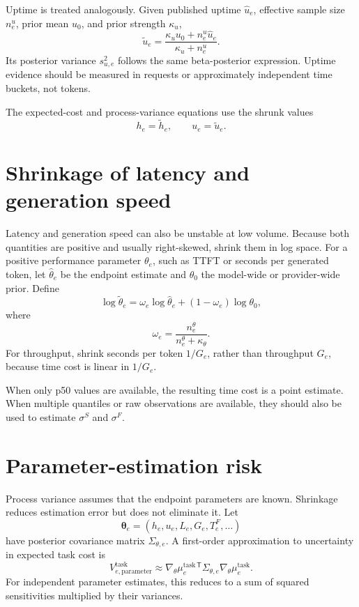\documentclass[11pt]{article}
\begin{document}
Uptime is treated analogously. Given published uptime $\hat u_e$, effective
sample size $n_e^u$, prior mean $u_0$, and prior strength $\kappa_u$,
\begin{equation}
\boxed{
\tilde u_e
=\frac{\kappa_uu_0+n_e^u\hat u_e}{\kappa_u+n_e^u}
}.
\end{equation}
Its posterior variance $s_{u,e}^2$ follows the same beta-posterior expression.
Uptime evidence should be measured in requests or approximately independent time
buckets, not tokens.

The expected-cost and process-variance equations use the shrunk values
\begin{equation}
h_e=\tilde h_e,
\qquad
u_e=\tilde u_e.
\end{equation}

\section{Shrinkage of latency and generation speed}

Latency and generation speed can also be unstable at low volume. Because both
quantities are positive and usually right-skewed, shrink them in log space. For a
positive performance parameter $\theta_e$, such as TTFT or seconds per generated
token, let $\hat\theta_e$ be the endpoint estimate and $\theta_0$ the model-wide
or provider-wide prior. Define
\begin{equation}
\log\tilde\theta_e
=\omega_e\log\hat\theta_e
+(1-\omega_e)\log\theta_0,
\end{equation}
where
\begin{equation}
\omega_e=\frac{n_e^\theta}{n_e^\theta+\kappa_\theta}.
\end{equation}
For throughput, shrink seconds per token $1/G_e$, rather than throughput $G_e$,
because time cost is linear in $1/G_e$.

When only p50 values are available, the resulting time cost is a point estimate.
When multiple quantiles or raw observations are available, they should also be
used to estimate $\sigma^S$ and $\sigma^F$.

\section{Parameter-estimation risk}

Process variance assumes that the endpoint parameters are known. Shrinkage reduces
estimation error but does not eliminate it. Let
\begin{equation}
\boldsymbol\theta_e=(h_e,u_e,L_e,G_e,T_e^F,\ldots)
\end{equation}
have posterior covariance matrix $\Sigma_{\theta,e}$. A first-order approximation
to uncertainty in expected task cost is
\begin{equation}
\boxed{
V_{e,\mathrm{parameter}}^{\mathrm{task}}
\approx
\nabla_{\!\theta}\mu_e^{\mathrm{task}\,\mathsf T}
\Sigma_{\theta,e}
\nabla_{\!\theta}\mu_e^{\mathrm{task}}
}.
\end{equation}
For independent parameter estimates, this reduces to a sum of squared sensitivities
multiplied by their variances.
\end{document}

